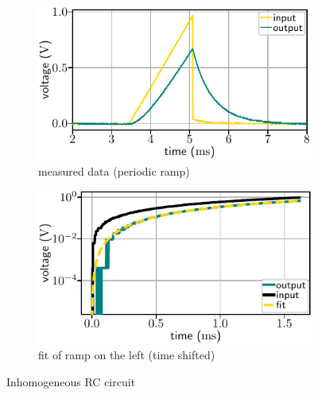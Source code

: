 \documentclass[10pt, a4paper]{article} %
\begin{document}
  \begin{figure}
     \centering
     \begin{subfigure}{0.495\textwidth}
	     \includegraphics[width=\textwidth]{rc_inhom_ana.pdf}
	     \caption{measured data (periodic ramp)}
     \end{subfigure}
	  \begin{subfigure}{0.495\textwidth}
	     \includegraphics[width=\textwidth]{rc_inhom_fit.pdf}
		  \caption{fit of ramp on the left (time shifted)}
     \end{subfigure}
	  \caption{Inhomogeneous RC circuit}
        \label{fig:rc_inhom}
\end{figure}
\end{document}
